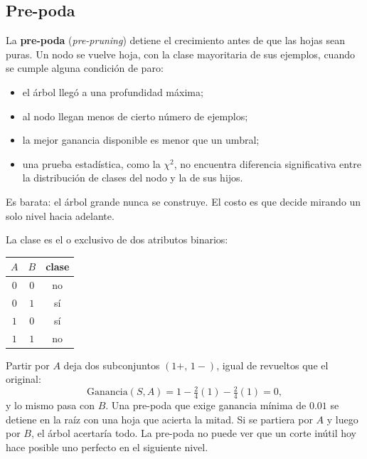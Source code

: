 \documentclass[11pt,letterpaper]{article}
\begin{document}
\subsection*{Pre-poda}

La \textbf{pre-poda} (\textit{pre-pruning}) detiene el crecimiento
antes de que las hojas sean puras. Un nodo se vuelve hoja, con la
clase mayoritaria de sus ejemplos, cuando se cumple alguna condición
de paro:

\begin{itemize}[itemsep=0.2em]
    \item el árbol llegó a una profundidad máxima;
    \item al nodo llegan menos de cierto número de ejemplos;
    \item la mejor ganancia disponible es menor que un umbral;
    \item una prueba estadística, como la $\chi^2$, no encuentra
          diferencia significativa entre la distribución de clases del
          nodo y la de sus hijos.
\end{itemize}

Es barata: el árbol grande nunca se construye. El costo es que decide
mirando un solo nivel hacia adelante.

\begin{ejemplo}
    La clase es el o exclusivo de dos atributos binarios:
    \begin{center}
    \small
    \begin{tabular}{ccc}
        \toprule
        $A$ & $B$ & clase \\
        \midrule
        $0$ & $0$ & no \\
        $0$ & $1$ & sí \\
        $1$ & $0$ & sí \\
        $1$ & $1$ & no \\
        \bottomrule
    \end{tabular}
    \end{center}
    Partir por $A$ deja dos subconjuntos $(1+,\,1-)$, igual de
    revueltos que el original:
    \[
        \text{Ganancia}(S, A)
            = 1 - \tfrac{2}{4}(1) - \tfrac{2}{4}(1) = 0 ,
    \]
    y lo mismo pasa con $B$. Una pre-poda que exige ganancia mínima de
    $0.01$ se detiene en la raíz con una hoja que acierta la mitad. Si
    se partiera por $A$ y luego por $B$, el árbol acertaría todo. La
    pre-poda no puede ver que un corte inútil hoy hace posible uno
    perfecto en el siguiente nivel.
\end{ejemplo}
\end{document}
